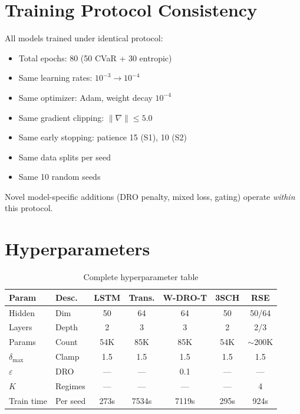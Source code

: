 \documentclass[11pt]{article}
\begin{document}
\section{Training Protocol Consistency}
\label{app:protocol}

All models trained under identical protocol:
\begin{itemize}[noitemsep]
    \item Total epochs: 80 (50 CVaR + 30 entropic)
    \item Same learning rates: $10^{-3} \to 10^{-4}$
    \item Same optimizer: Adam, weight decay $10^{-4}$
    \item Same gradient clipping: $\|\nabla\| \leq 5.0$
    \item Same early stopping: patience 15 (S1), 10 (S2)
    \item Same data splits per seed
    \item Same 10 random seeds
\end{itemize}

Novel model-specific additions (DRO penalty, mixed loss, gating) operate \emph{within} this protocol.

\section{Hyperparameters}
\label{app:hyper}

\begin{table}[h]
\centering
\caption{Complete hyperparameter table}
\scriptsize
\begin{tabular}{llccccc}
\toprule
\textbf{Param} & \textbf{Desc.} & \textbf{LSTM} & \textbf{Trans.} & \textbf{W-DRO-T} & \textbf{3SCH} & \textbf{RSE} \\
\midrule
Hidden & Dim & 50 & 64 & 64 & 50 & 50/64 \\
Layers & Depth & 2 & 3 & 3 & 2 & 2/3 \\
Params & Count & 54K & 85K & 85K & 54K & $\sim$200K \\
$\delta_{\max}$ & Clamp & 1.5 & 1.5 & 1.5 & 1.5 & 1.5 \\
$\varepsilon$ & DRO & --- & --- & 0.1 & --- & --- \\
$K$ & Regimes & --- & --- & --- & --- & 4 \\
Train time & Per seed & 273s & 7534s & 7119s & 295s & 924s \\
\bottomrule
\end{tabular}
\end{table}
\end{document}
